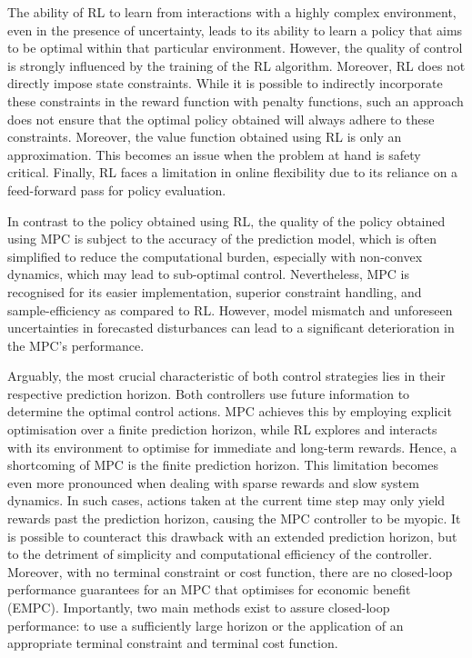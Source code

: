The ability of RL to learn from interactions with a highly complex environment, even in the presence of uncertainty, leads to its ability to learn a policy that aims to be optimal within that particular environment. However, the quality of control is strongly influenced by the training of the RL algorithm. Moreover, RL does not directly impose state constraints. While it is possible to indirectly incorporate these constraints  in the reward function with penalty functions, such an approach does not ensure that the optimal policy obtained will always adhere to these constraints. Moreover, the value function obtained using RL is only an approximation. This becomes an issue when the problem at hand is safety critical. Finally, RL faces a limitation in online flexibility due to its reliance on a feed-forward pass for policy evaluation.

In contrast to the policy obtained using RL, the quality of the policy obtained using MPC is subject to the accuracy of the prediction model, which is often simplified to reduce the computational burden, especially with non-convex dynamics, which may lead to sub-optimal control. Nevertheless, MPC is recognised for its easier implementation, superior constraint handling, and sample-efficiency as compared to RL. However, model mismatch and unforeseen uncertainties in forecasted disturbances can lead to a significant deterioration in the MPC's performance. 

Arguably, the most crucial characteristic of both control strategies lies in their respective prediction horizon. Both controllers use future information to determine the optimal control actions. MPC achieves this by employing explicit optimisation over a finite prediction horizon, while RL explores and interacts with its environment to optimise for immediate and long-term rewards. Hence, a shortcoming of MPC is the finite prediction horizon. This limitation becomes even more pronounced when dealing with sparse rewards and slow system dynamics. In such cases, actions taken at the current time step may only yield rewards past the prediction horizon, causing the MPC controller to be myopic. It is possible to counteract this drawback with an extended prediction horizon, but to the detriment of simplicity and computational efficiency of the controller. Moreover, with no terminal constraint or cost function, there are no closed-loop performance guarantees for an MPC that optimises for economic benefit (EMPC). Importantly, two main methods exist to assure closed-loop performance: to use a sufficiently large horizon or the application of an appropriate terminal constraint and terminal cost function.

